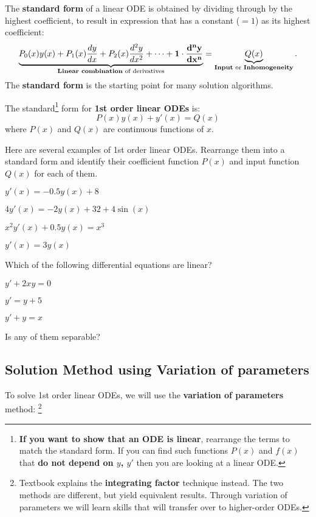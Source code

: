 The \textbf{standard form} of a linear ODE is obtained by dividing through by the highest coefficient, to result in expression that has a constant (\(=1\)) as its highest coefficient:
\[
\underbrace{P_{0}(x)y(x) + P_{1}(x)\frac{dy}{dx} + P_{2}(x)\frac{d^{2}y}{dx^{2}} + \dots + \mathbf{1 \cdot \frac{d^{n}y}{dx^n}}}_{\text{\textbf{Linear combination} of derivatives}} = \underbrace{Q(x)}_{\text{\textbf{Input} or \textbf{Inhomogeneity}}}.
\]
The \textbf{standard form} is the starting point for many solution algorithms.

The standard\footnote{\textbf{If you want to show that an ODE is linear}, rearrange the terms to match the standard form. If you can find such functions \(P(x)\) and \(f(x)\) that \textbf{do not depend on \(y\), \(y'\)} then you are looking at a linear ODE.}
 form for \textbf{1st order linear ODEs} is:
\[
  P(x) y(x) + y'(x) = Q(x)
\]
where $P(x)$ and $Q(x)$ are continuous functions of $x$.

Here are several examples of 1st order linear ODEs. Rearrange them into a standard form and identify their coefficient function \(P(x)\) and input function \(Q(x)\) for each of them.
  \begin{colenumerate}[2]
  \item \(y'(x) = -0.5 y(x) + 8\)
  \item \(4y'(x) = -2 y(x) + 32 + 4 \sin(x)\)
  \item \(x^{2} y'(x) + 0.5 y(x) = x^{3}\)
  \item \(y'(x) = 3 y(x)\)
  \end{colenumerate}

\begin{question}
    Which of the following differential equations are linear?
    \begin{colenumerate}[3]
        \item \(y' + 2xy = 0\)
        \item \(y' = y + 5\)
        \item \(y' + y = x\)
    \end{colenumerate}
    \noindent Is any of them separable?
\end{question}

\subsection{Solution Method using Variation of parameters}

To solve 1st order linear ODEs, we will use the \textbf{variation of parameters} method: \footnote{Textbook explains the \textbf{integrating factor} technique instead. The two methods are different, but yield equivalent results. Through variation of parameters we will learn skills that will transfer over to higher-order ODEs.}

